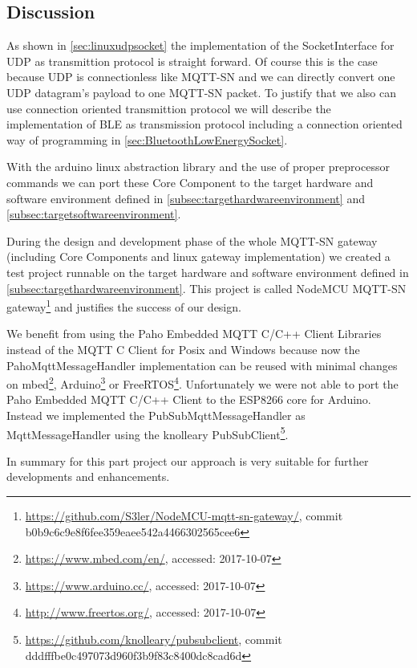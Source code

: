 \subsection{Discussion}
As shown in \autoref{sec:linuxudpsocket} the implementation of the SocketInterface for UDP as transmittion protocol is straight forward.
Of course this is the case because UDP is connectionless like MQTT-SN and we can directly convert one UDP datagram's payload to one MQTT-SN packet.
To justify that we also can use connection oriented transmittion protocol we will describe the implementation of BLE as transmission protocol including a connection oriented way of programming in \autoref{sec:BluetoothLowEnergySocket}.

With the arduino linux abstraction library and the use of proper preprocessor commands we can port these Core Component to the target hardware and software environment defined in \autoref{subsec:targethardwareenvironment} and \autoref{subsec:targetsoftwareenvironment}.

During the design and development phase of the whole MQTT-SN gateway (including Core Components and linux gateway implementation) we created a test project runnable on the target hardware and software environment defined in \autoref{subsec:targethardwareenvironment}.
This project is called NodeMCU MQTT-SN gateway\footnote{\url{https://github.com/S3ler/NodeMCU-mqtt-sn-gateway/}, commit b0b9c6c9e8f6fee359eaee542a4466302565cee6} and justifies the success of our design.

We benefit from using the Paho Embedded MQTT C/C++ Client Libraries instead of the MQTT C Client for Posix and Windows\cite{PahoMqttClient} because now the PahoMqttMessageHandler implementation can be reused with minimal changes on mbed\footnote{\url{https://www.mbed.com/en/}, accessed: 2017-10-07}, Arduino\footnote{\url{https://www.arduino.cc/}, accessed: 2017-10-07} or FreeRTOS\footnote{\url{http://www.freertos.org/}, accessed: 2017-10-07}\cite{PahoMqttEmbbeddedcClient}.
Unfortunately we were not able to port the Paho Embedded MQTT C/C++ Client to the ESP8266 core for Arduino.
Instead we implemented the PubSubMqttMessageHandler as MqttMessageHandler using the knolleary PubSubClient\footnote{\url{https://github.com/knolleary/pubsubclient}, commit dddfffbe0c497073d960f3b9f83c8400dc8cad6d}\cite{nodemcupubsubmqttmessagehandler}.


In summary for this part project our approach is very suitable for further developments and enhancements.
